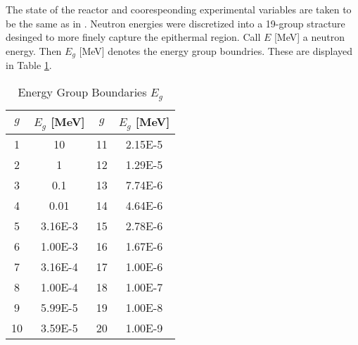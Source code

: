 \documentclass{physor2012}
\begin{document}
The state of the reactor and coorespeonding experimental variables are taken
to be the same as in \cite{}.  Neutron energies were discretized into a 19-group
stracture desinged to more finely capture the epithermal region.  Call $E$ [MeV]
a neutron energy. Then $E_g$ [MeV] denotes the energy group boundries.
These are displayed in Table \ref{group_boundaries}.
\begin{table}[htbp]
\begin{center}
\caption{Energy Group Boundaries $E_g$}
\label{group_boundaries}
\begin{tabular}{|c|c||c|c|}
\hline
\textbf{$g$} & \textbf{$E_g$ [MeV]} & \textbf{$g$} & \textbf{$E_g$ [MeV]} \\
\hline
1  & 10      & 11 & 2.15E-5 \\ 
2  & 1       & 12 & 1.29E-5 \\ 
3  & 0.1     & 13 & 7.74E-6 \\
4  & 0.01    & 14 & 4.64E-6 \\
5  & 3.16E-3 & 15 & 2.78E-6 \\
6  & 1.00E-3 & 16 & 1.67E-6 \\
7  & 3.16E-4 & 17 & 1.00E-6 \\
8  & 1.00E-4 & 18 & 1.00E-7 \\
9  & 5.99E-5 & 19 & 1.00E-8 \\
10 & 3.59E-5 & 20 & 1.00E-9 \\
\hline
\end{tabular}
\end{center}
\end{table}
\end{document}
